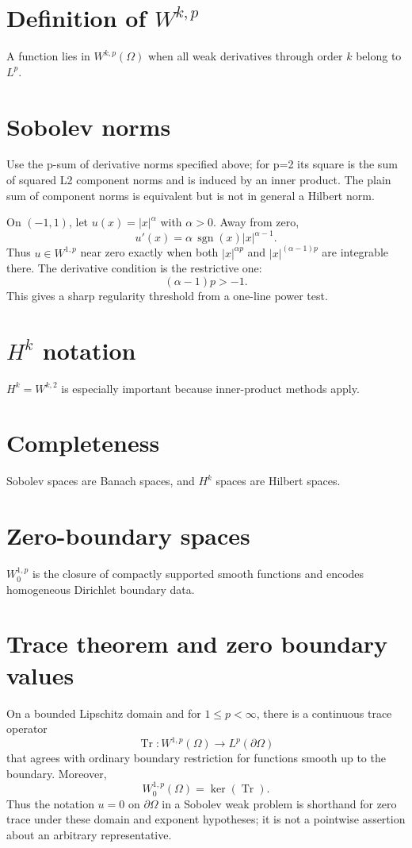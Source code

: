 \section{Definition of $W^{k,p}$}
A function lies in $W^{k,p}(\Omega)$ when all weak derivatives through order $k$ belong to $L^p$.

\section{Sobolev norms}
Use the p-sum of derivative norms specified above; for p=2 its square is the sum of squared L2 component norms and is induced by an inner product. The plain sum of component norms is equivalent but is not in general a Hilbert norm.


\begin{example}\label{ex:iii21-expand-01}
On \((-1,1)\), let \(u(x)=|x|^\alpha\) with \(\alpha>0\). Away from zero,
\[
u'(x)=\alpha\,\operatorname{sgn}(x)|x|^{\alpha-1}.
\]
Thus \(u\in W^{1,p}\) near zero exactly when both
\(|x|^{\alpha p}\) and \(|x|^{(\alpha-1)p}\) are integrable there. The
derivative condition is the restrictive one:
\[
(\alpha-1)p>-1.
\]
This gives a sharp regularity threshold from a one-line power test.
\end{example}
\section{$H^k$ notation}
$H^k=W^{k,2}$ is especially important because inner-product methods apply.

\section{Completeness}
Sobolev spaces are Banach spaces, and $H^k$ spaces are Hilbert spaces.

\section{Zero-boundary spaces}
$W_0^{1,p}$ is the closure of compactly supported smooth functions and encodes homogeneous Dirichlet boundary data.

\section{Trace theorem and zero boundary values}
On a bounded Lipschitz domain and for \(1\le p<\infty\), there is a continuous
trace operator
\[
\operatorname{Tr}:W^{1,p}(\Omega)\longrightarrow L^p(\partial\Omega)
\]
that agrees with ordinary boundary restriction for functions smooth up to the
boundary. Moreover,
\[
W_0^{1,p}(\Omega)=\ker(\operatorname{Tr}).
\]
Thus the notation \(u=0\) on \(\partial\Omega\) in a Sobolev weak problem is
shorthand for zero trace under these domain and exponent hypotheses; it is not
a pointwise assertion about an arbitrary representative.

